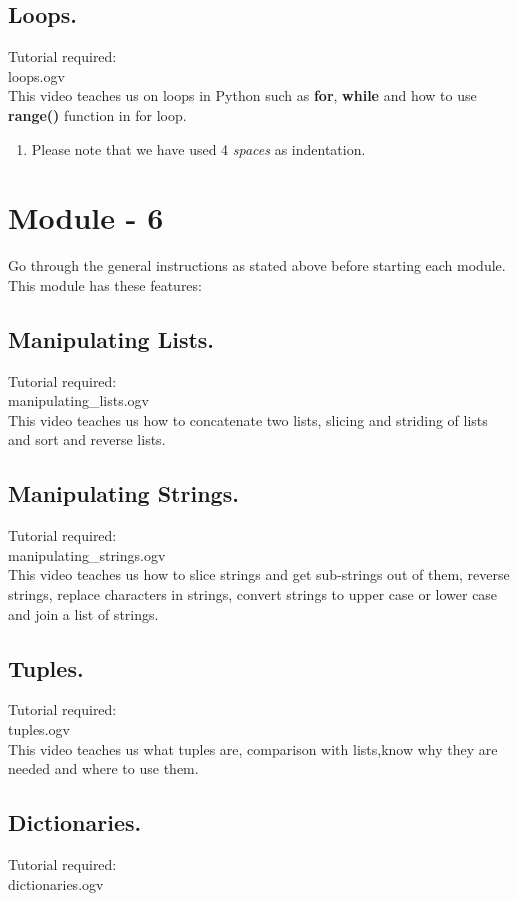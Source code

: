 \documentclass[11pt,twocolumn]{article}
\newenvironment{enumcpt}{\begin{enumerate} \topsep 0pt \partopsep 0pt 
                        \parsep 0pt
                        \itemsep 0pt \leftmargin -1in \rightmargin 0pt
                        }{\end{enumerate}}
\begin{document}
\subsection{Loops.}
Tutorial required: \\loops.ogv \\

This video teaches us on loops in Python such as \textbf{for}, \textbf{while} and how to use \textbf{range()} function in for loop. \\ 
\begin{enumcpt}
\item Please note that we have used 4 \emph{spaces} as indentation.
\end{enumcpt} 

\section{Module - 6}
Go through the general instructions as stated above before starting each module.
This module has these features:
\subsection{Manipulating Lists.}
Tutorial required: \\manipulating\_lists.ogv \\
 
This video teaches us how to concatenate two lists, slicing and striding of lists and sort and reverse lists.
\subsection{Manipulating Strings.}
Tutorial required: \\manipulating\_strings.ogv \\

This video teaches us how to slice strings and get sub-strings out of them, reverse strings, replace characters in strings, convert strings to upper case or lower case and join  a list of strings. 
\subsection{Tuples.}
Tutorial required: \\tuples.ogv \\

This video teaches us what tuples are, comparison with lists,know why they are needed and where to use them. 
\subsection{Dictionaries.}
Tutorial required: \\dictionaries.ogv \\
\end{document}

